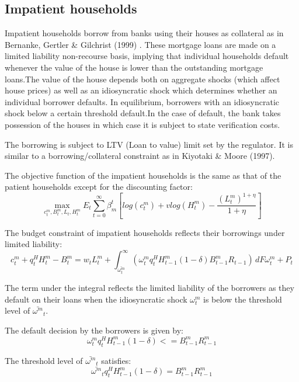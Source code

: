\documentclass[12pt]{article}
\numberwithin{equation}{section}
\begin{document}
\begin{appendix}
\subsection*{Impatient households}

Impatient households borrow from banks using their houses as collateral as in Bernanke, Gertler \& Gilchrist (1999) . These mortgage loans are made on a limited liability non-recourse basis,  implying that individual households default whenever the value of the house is lower than the outstanding mortgage loans.The value of the house depends both on aggregate shocks (which affect house prices) as well as an idiosyncratic shock which determines whether an individual borrower defaults. In equilibrium, borrowers with an idiosyncratic shock below a certain threshold default.In the case of default, the bank takes possession of the houses in which case it is subject to state verification costs.

The borrowing is subject to LTV (Loan to value) limit set by the regulator. It is similar to a borrowing/collateral constraint as in Kiyotaki \& Moore (1997).

The objective function of the impatient households is the same as that of the patient households except for the discounting factor:
\begin{equation}
\max_{c^m_t,B^m_t,L_{t},H^m_t}E_t\sum _{t=0}^{\infty } \beta^t_{m} [log(c^m_t)+vlog(H^m_t)-\frac{(L^m_t)^{1+\eta}}{1+\eta} ]
\end{equation}

The budget constraint of impatient households reflects their borrowings under limited liability:
\begin{equation}
c^m_t+q^H_{t}H^m_{t} -B^m_{t}=w_{t}L^m_{t}+\int_{\bar{\omega^m_{t} }}^\infty  \left(\omega^m_{t} q^H_{t} H^m_{t-1} (1-\delta)B^m_{t-1}R_{t-1}\right) \, dF\omega^m_{t} + P_{t}
\end{equation}

The term under the integral reflects the limited liability of the borrowers as they default on their loans when the idiosyncratic shock $\omega^m_{t}$ is below the threshold level of $\bar{\omega^m}_t$. 

The default decision by the borrowers is given by:
\begin{equation}
{{\omega^m_{t} }}q^H_{t} H^m_{t-1}(1-\delta) <= B^m_{t-1}R^m_{t-1}
\end{equation}

The threshold level of $\bar{\omega^m}_t$ satisfies:
\begin{equation}
\bar{\omega^m}_t q^H_{t} H^m_{t-1}(1-\delta) = B^m_{t-1}R^m_{t-1}
\end{equation}



\end{appendix}
\end{document}

